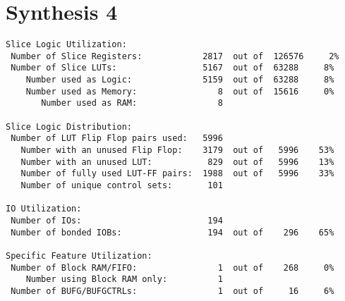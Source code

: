 \section*{Synthesis 4}
\begin{verbatim}
Slice Logic Utilization: 
 Number of Slice Registers:            2817  out of  126576     2%  
 Number of Slice LUTs:                 5167  out of  63288     8%  
    Number used as Logic:              5159  out of  63288     8%  
    Number used as Memory:                8  out of  15616     0%  
       Number used as RAM:                8

Slice Logic Distribution: 
 Number of LUT Flip Flop pairs used:   5996
   Number with an unused Flip Flop:    3179  out of   5996    53%  
   Number with an unused LUT:           829  out of   5996    13%  
   Number of fully used LUT-FF pairs:  1988  out of   5996    33%  
   Number of unique control sets:       101

IO Utilization: 
 Number of IOs:                         194
 Number of bonded IOBs:                 194  out of    296    65%  

Specific Feature Utilization:
 Number of Block RAM/FIFO:                1  out of    268     0%  
    Number using Block RAM only:          1
 Number of BUFG/BUFGCTRLs:                1  out of     16     6%  
\end{verbatim}
